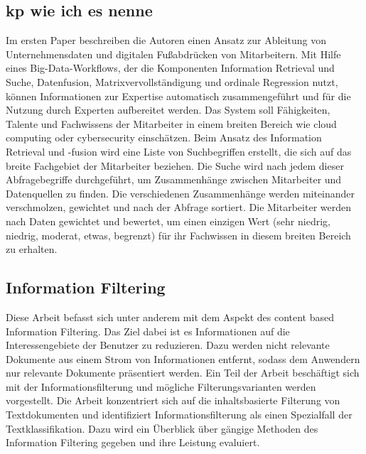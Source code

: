 \subsection{kp wie ich es nenne}

Im ersten Paper beschreiben die Autoren einen Ansatz zur Ableitung von Unternehmensdaten und digitalen Fußabdrücken von Mitarbeitern. Mit Hilfe eines Big-Data-Workflows, der die Komponenten Information Retrieval und Suche, Datenfusion, Matrixvervollständigung und ordinale Regression nutzt, können Informationen zur Expertise automatisch zusammengeführt und für die Nutzung durch Experten aufbereitet werden. Das System soll Fähigkeiten, Talente und Fachwissens der Mitarbeiter in einem breiten Bereich wie cloud computing oder cybersecurity einschätzen. Beim Ansatz des Information Retrieval und -fusion wird eine Liste von Suchbegriffen erstellt, die sich auf das breite Fachgebiet der Mitarbeiter beziehen. Die Suche wird nach jedem dieser Abfragebegriffe durchgeführt, um Zusammenhänge zwischen Mitarbeiter und Datenquellen zu finden. Die verschiedenen Zusammenhänge werden miteinander verschmolzen, gewichtet und nach der Abfrage sortiert. Die Mitarbeiter werden nach Daten gewichtet und bewertet, um einen einzigen Wert (sehr niedrig, niedrig, moderat, etwas, begrenzt) für ihr Fachwissen in diesem breiten Bereich zu erhalten.\cite{horesh2016information}\\



\subsection{Information Filtering}
Diese Arbeit befasst sich unter anderem mit dem Aspekt des content based Information Filtering. Das Ziel dabei ist es Informationen auf die Interessengebiete der Benutzer zu reduzieren. Dazu werden nicht relevante Dokumente aus einem Strom von Informationen entfernt, sodass dem Anwendern nur relevante Dokumente präsentiert werden. Ein Teil der Arbeit beschäftigt sich mit der Informationsfilterung und mögliche Filterungsvarianten werden vorgestellt. Die Arbeit konzentriert sich auf die inhaltsbasierte Filterung von Textdokumenten und identifiziert Informationsfilterung als einen Spezialfall der Textklassifikation. Dazu wird ein Überblick über gängige Methoden des Information Filtering gegeben und ihre Leistung evaluiert.
\cite{lanquillon2001enhancing}


